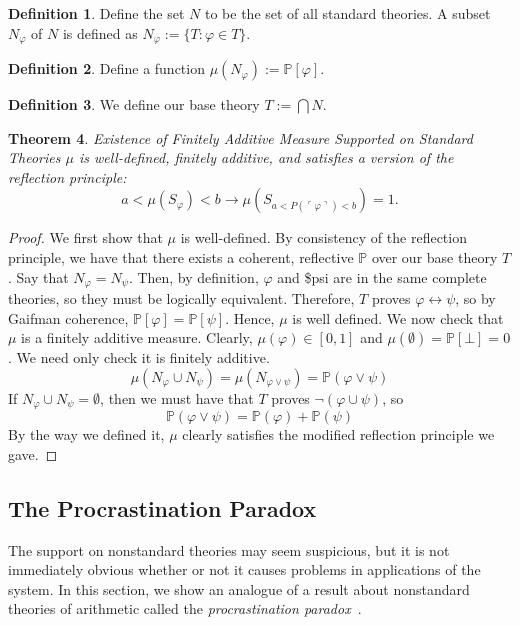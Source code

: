 \documentclass[12pt]{article}
\newcommand{\PP}{\mathbb{P}}
\newcommand{\vp}{\varphi}
\theoremstyle{plain}
\newtheorem{theorem}{Theorem}[subsection]
\theoremstyle{definition}
\newtheorem{definition}[theorem]{Definition}
\theoremstyle{remark}
\begin{document}
\begin{definition}
Define the set $N$ to be the set of all standard theories. A subset $N_{\vp}$ of $N$ is defined as $N_{\vp}:=\{T:\vp\in T\}$.
\end{definition}
\begin{definition}
Define a function $\mu(N_{\vp}):=\PP[\vp]$.
\end{definition}
\begin{definition}
We define our base theory $T:=\bigcap N$.
\end{definition}
\begin{theorem} \emph{Existence of Finitely Additive Measure Supported on Standard Theories}
$\mu$ is well-defined, finitely additive, and satisfies a version of the reflection principle:
$$a < \mu(S_{\vp}) < b \rightarrow \mu(S_{a < P(\ulcorner \vp \urcorner) < b}) = 1.$$
\end{theorem}
\begin{proof}
We first show that $\mu$ is well-defined. By consistency of the reflection principle, we have that there exists a coherent, reflective $\PP$ over our base theory $T$.
Say that $N_{\vp}=N_{\psi}$. Then, by definition, $\vp$ and \$psi are in the same complete theories, so they must be logically equivalent. Therefore, $T$ proves $\vp\leftrightarrow\psi$, so by Gaifman coherence, $\PP[\vp]=\PP[\psi]$. Hence, $\mu$ is well defined.
We now check that $\mu$ is a finitely additive measure. Clearly, $\mu(\vp)\in[0,1]$ and $\mu(\emptyset)=\PP[\bot]=0$.
We need only check it is finitely additive. 
$$\mu(N_{\vp}\cup N_{\psi})=\mu(N_{\vp\vee\psi})=\PP(\vp\vee\psi)$$
If $N_{\vp}\cup N_{\psi}=\emptyset$, then we must have that $T$ proves $\neg(\vp\cup\psi)$, so 
$$\PP(\vp\vee\psi)=\PP(\vp)+\PP(\psi)$$
By the way we defined it, $\mu$ clearly satisfies the modified reflection principle we gave.
\end{proof}
\subsection{The Procrastination Paradox}


The support on nonstandard theories may seem suspicious, but it is not immediately obvious whether or not it causes problems in applications of the system. In this section, we show an analogue of a result about nonstandard theories of arithmetic called the \emph{procrastination paradox}~\cite{yudkowsky13}. 
\end{document}
